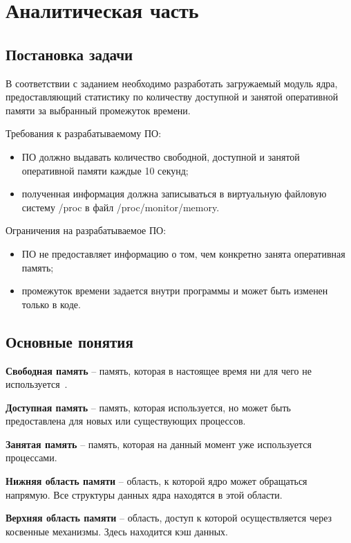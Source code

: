 \section{Аналитическая часть}

\subsection{Постановка задачи}

В соответствии с заданием необходимо разработать загружаемый модуль ядра, предоставляющий статистику по количеству доступной и занятой оперативной памяти за выбранный промежуток времени.

Требования к разрабатываемому ПО:
\begin{itemize}
	\item ПО должно выдавать количество свободной, доступной и занятой оперативной памяти каждые 10 секунд;
	
	\item полученная информация должна записываться в виртуальную файловую систему /proc в файл /proc/monitor/memory.
\end{itemize}

Ограничения на разрабатываемое ПО:
\begin{itemize}
	\item ПО не предоставляет информацию о том, чем конкретно занята оперативная память;
	
	\item промежуток времени задается внутри программы и может быть изменен только в коде.
\end{itemize}

\subsection{Основные понятия}

\textbf{Свободная память} -- память, которая в настоящее время ни для чего не используется~\cite{freemem}.

\textbf{Доступная память} -- память, которая используется, но может быть предоставлена для новых или существующих процессов.

\textbf{Занятая память} -- память, которая на данный момент уже используется процессами.

\textbf{Нижняя область памяти} -- область, к которой ядро может обращаться напрямую. Все структуры данных ядра находятся в этой области.

\textbf{Верхняя область памяти} -- область, доступ к которой осуществляется через косвенные механизмы. Здесь находится кэш данных.

